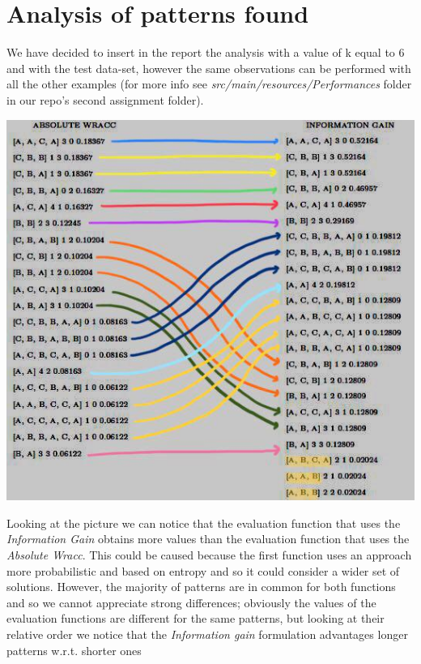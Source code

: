 \documentclass[10pt, a4paper]{article}
\begin{document}
	\section{Analysis of patterns found}
	We have decided to insert in the report the analysis with a value of k equal to 6 and with the test data-set, however the same observations can be performed with all the other examples (for more info see\textit{ src/main/resources/Performances} folder in our repo's second assignment folder).
	\begin{center}
	\includegraphics[scale =0.8]{patterns.jpg}\par\vspace{1cm}
	\end{center}
	\noindent
	Looking at the picture we can notice that the evaluation function that uses the \textit{Information Gain} obtains more values than the evaluation function that uses the \textit{Absolute Wracc}. This could be caused because the first function uses an approach more probabilistic and based on entropy and so it could consider a wider set of solutions.
	However, the majority of patterns are in common for both functions and so we cannot appreciate strong differences; obviously the values of the evaluation functions are different for the same patterns, but looking at their relative order we notice that the \textit{Information gain} formulation advantages longer patterns w.r.t. shorter ones
\end{document}
